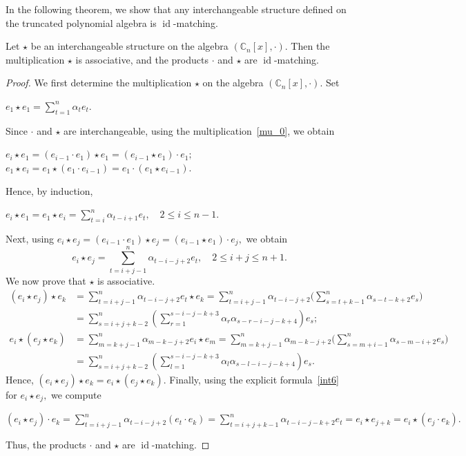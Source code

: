 \documentclass{jonasart}
\DeclareMathOperator{\id}{id}
\begin{document}
	In the following theorem, we show that any interchangeable structure defined on the truncated polynomial algebra is $\id$-matching.

	\begin{theorem}\label{Interchangeable} Let $ \star$ be an interchangeable structure on the algebra $(\mathbb{C}_n [x],\cdot).$ Then the multiplication $\star$ is associative, and the products $\cdot$ and $\star$ are $\id$-matching.
	\end{theorem}

	\begin{proof}
		We first determine the multiplication $\star$ on the algebra $(\mathbb{C}_n [x],\cdot).$
		Set
		\begin{center}
			$e_1\star e_1 =\sum_{t=1}^{n}\alpha_{t}e_t.$
		\end{center}
		Since $\cdot$ and $\star$ are interchangeable, using the multiplication~\eqref{mu_0}, we obtain
		\begin{center}
			$e_i\star e_1 =(e_{i-1} \cdot e_1 )\star e_1 = (e_{i-1} \star e_1 )\cdot e_1;$\\
			$e_1\star e_i = e_1\star (e_1\cdot e_{i-1})=e_1\cdot (e_1\star e_{i-1}).$
		\end{center}
		Hence, by induction,
		\begin{center}
			$e_{i}\star e_1 =e_1\star e_{i}=\sum_{t=i}^{n}\alpha_{t-i+1}e_t, \quad 2\leq i \leq n-1.$
		\end{center}
		Next, using
		$e_i\star e_j =(e_{i-1}\cdot e_1 )\star e_j =(e_{i-1}\star e_1 )\cdot e_j,$ we obtain
		\begin{equation}\label{int6}
			e_i \star e_j =\sum_{t=i+j-1}^{n}\alpha_{t-i-j+2}e_t, \quad 2\leq i+j \leq n+1.
		\end{equation}
		We now prove that $\star$ is associative.
		\begin{align*}
			(e_i \star e_j ) \star e_k &= \sum_{t=i+j-1}^{n}\alpha_{t-i-j+2}e_t \star e_k =\sum_{t=i+j-1}^{n}\alpha_{t-i-j+2} \big( \sum_{s=t+k-1}^{n}\alpha_{s-t-k+2} e_s \big)\\
			&=\sum_{s=i+j+k-2}^{n} \left(\sum_{r=1}^{s-i-j-k+3}\alpha_{r} \alpha_{s-r-i-j-k+4}\right)e_s;\\
			e_i \star (e_j \star e_k ) &= \sum_{m=k+j-1}^{n}\alpha_{m-k-j+2}e_i \star e_m =\sum_{m=k+j-1}^{n}\alpha_{m-k-j+2} \big( \sum_{s=m+i-1}^{n}\alpha_{s-m-i+2} e_s \big)\\
			&=\sum_{s=i+j+k-2}^{n} \left(\sum_{l=1}^{s-i-j-k+3}\alpha_{l} \alpha_{s-l-i-j-k+4}\right)e_s.
		\end{align*}
		Hence, $(e_i \star e_j ) \star e_k = e_i \star (e_j \star e_k )$. Finally, using the explicit formula~\eqref{int6} for $e_i\star e_j,$ we compute
		\begin{center}
			$(e_i\star e_j )\cdot e_k = \sum_{t=i+j-1}^{n}\alpha_{t-i-j+2}(e_t\cdot e_k )=\sum_{t=i+j+k-1}^{n}\alpha_{t-i-j-k+2}e_t =e_i\star e_{j+k}=e_i\star (e_j\cdot e_k ).$
		\end{center}
		Thus, the products $\cdot$ and $\star$ are $\id$-matching.
	\end{proof}
\end{document}
